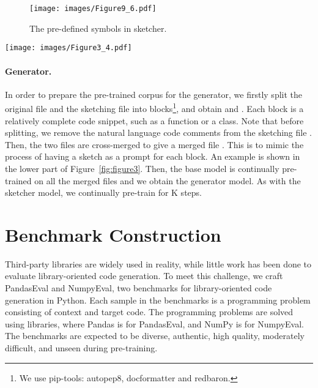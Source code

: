 \documentclass{article}
\newcommand{\peval}{PandasEval\xspace}
\newcommand{\neval}{NumpyEval\xspace}
\newcommand{\pandas}{Pandas\xspace}
\newcommand{\numpy}{NumPy\xspace}
\begin{document}
\begin{figure}[t]
    \small
    \centering
    \texttt{[image: images/Figure9\_6.pdf]}
\caption{The pre-defined symbols in sketcher.}
    \label{fig:figure8}
\end{figure}

\begin{figure*}[t]
    \small
    \centering
    \texttt{[image: images/Figure3\_4.pdf]}
\caption{Training data preparation for sketcher and generator with an example in \pandas.}
    \label{fig:figure3}
\end{figure*}

\paragraph{Generator.}
In order to prepare the pre-trained corpus for the generator, we firstly split the original file  and the sketching file  into  blocks\footnote{We use pip-tools: autopep8, docformatter and redbaron.}, and obtain  and . Each block is a relatively complete code snippet, such as a function or a class. Note that before splitting, we remove the natural language code comments from the sketching file . Then, the two files are cross-merged to give a merged file . This is to mimic the process of having a sketch as a prompt for each block. An example is shown in the lower part of Figure~\ref{fig:figure3}. Then, the base model is continually pre-trained on all the merged files  and we obtain the generator model. As with the sketcher model, we continually pre-train for K steps.

\section{Benchmark Construction} \label{pandasevalandnumpyevaldatasets}

Third-party libraries are widely used in reality, while little work has been done to evaluate library-oriented code generation. To meet this challenge, we craft \peval and \neval, two benchmarks for library-oriented code generation in Python. Each sample in the benchmarks is a programming problem consisting of context and target code. The programming problems are solved using libraries, where \pandas is for \peval, and \numpy is for \neval. The benchmarks are expected to be diverse, authentic, high quality, moderately difficult, and unseen during pre-training.
\end{document}
